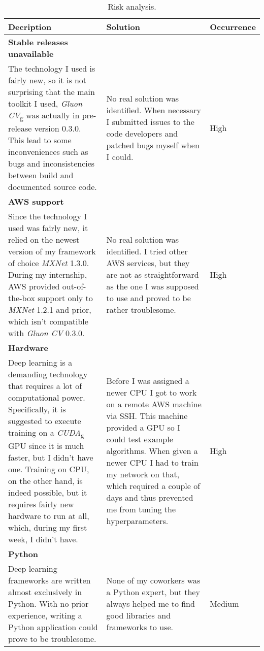 \begin{center}
\begin{table}
\caption{Risk analysis.}
    \begin{tabular}{ | p{5cm} | p{5cm} | p{2cm} |}
    \hline
    \textbf{Decription} & \textbf{Solution} & \textbf{Occurrence} \\ \hline
    \textbf{Stable releases unavailable} \\ The technology I used is fairly new, so it is not surprising that the main toolkit I used, \emph{\gls{Gluon CV}}\textsubscript{g} was actually in pre-release version 0.3.0. This lead to some inconveniences such as bugs and inconsistencies between build and documented source code. & No real solution was identified. When necessary I submitted issues to the code developers and patched bugs myself when I could. & High \\ \hline
    \textbf{AWS support}\\ Since the technology I used was fairly new, it relied on the newest version of my framework of choice \emph{MXNet} 1.3.0. During my internship, AWS provided out-of-the-box support only to \emph{MXNet} 1.2.1 and prior, which isn't compatible with \emph{Gluon CV} 0.3.0. & No real solution was identified. I tried other AWS services, but they are not as straightforward as the one I was supposed to use and proved to be rather troublesome. & High \\ \hline
    \textbf{Hardware} \\ Deep learning is a demanding technology that requires a lot of computational power. Specifically, it is suggested to execute training on a \emph{\gls{CUDA}}\textsubscript{g} GPU since it is much faster, but I didn't have one. Training on CPU, on the other hand, is indeed possible, but it requires fairly new hardware to run at all, which, during my first week, I didn't have. & Before I was assigned a newer CPU I got to work on a remote AWS machine via SSH. This machine provided a GPU so I could test example algorithms. When given a newer CPU I had to train my network on that, which required a couple of days and thus prevented me from tuning the hyperparameters. & High \\ \hline
   \textbf{Python} \\ Deep learning frameworks are written almost exclusively in Python. With no prior experience, writing a Python application could prove to be troublesome. & None of my coworkers was a Python expert, but they always helped me to find good libraries and frameworks to use. & Medium \\ \hline
   \end{tabular}
\end{table}
\end{center}



